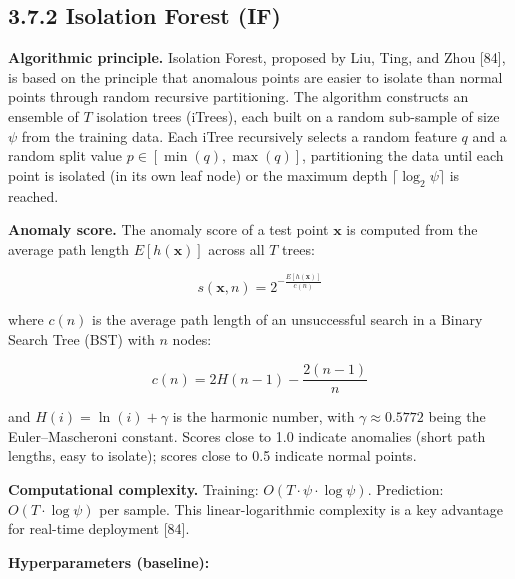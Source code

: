 \documentclass[
  a4paper]{report}
\begin{document}
\subsection{3.7.2 Isolation Forest (IF)}\label{isolation-forest-if}

\textbf{Algorithmic principle.} Isolation Forest, proposed by Liu, Ting,
and Zhou {[}84{]}, is based on the principle that anomalous points are
easier to isolate than normal points through random recursive
partitioning. The algorithm constructs an ensemble of \(T\) isolation
trees (iTrees), each built on a random sub-sample of size \(\psi\) from
the training data. Each iTree recursively selects a random feature \(q\)
and a random split value \(p \in [\min(q), \max(q)]\), partitioning the
data until each point is isolated (in its own leaf node) or the maximum
depth \(\lceil \log_2 \psi \rceil\) is reached.

\textbf{Anomaly score.} The anomaly score of a test point \(\mathbf{x}\)
is computed from the average path length \(E[h(\mathbf{x})]\) across all
\(T\) trees:

\[s(\mathbf{x}, n) = 2^{-\frac{E[h(\mathbf{x})]}{c(n)}}\]

where \(c(n)\) is the average path length of an unsuccessful search in a
Binary Search Tree (BST) with \(n\) nodes:

\[c(n) = 2H(n-1) - \frac{2(n-1)}{n}\]

and \(H(i) = \ln(i) + \gamma\) is the harmonic number, with
\(\gamma \approx 0.5772\) being the Euler--Mascheroni constant. Scores
close to 1.0 indicate anomalies (short path lengths, easy to isolate);
scores close to 0.5 indicate normal points.

\textbf{Computational complexity.} Training:
\(O(T \cdot \psi \cdot \log \psi)\). Prediction:
\(O(T \cdot \log \psi)\) per sample. This linear-logarithmic complexity
is a key advantage for real-time deployment {[}84{]}.

\textbf{Hyperparameters (baseline):}
\end{document}
